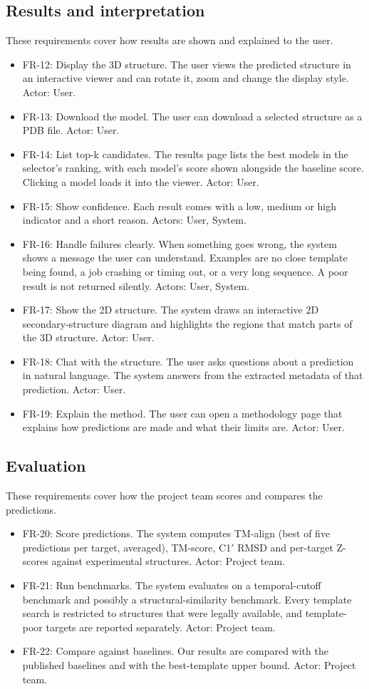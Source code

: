 \documentclass{FastFyp}
\begin{document}
\subsection{Results and interpretation}
These requirements cover how results are shown and explained to the user.
\begin{itemize}
\item FR-12: Display the 3D structure. The user views the predicted structure in an interactive viewer and can rotate it, zoom and change the display style. Actor: User.
\item FR-13: Download the model. The user can download a selected structure as a PDB file. Actor: User.
\item FR-14: List top-k candidates. The results page lists the best models in the selector's ranking, with each model's score shown alongside the baseline score. Clicking a model loads it into the viewer. Actor: User.
\item FR-15: Show confidence. Each result comes with a low, medium or high indicator and a short reason. Actors: User, System.
\item FR-16: Handle failures clearly. When something goes wrong, the system shows a message the user can understand. Examples are no close template being found, a job crashing or timing out, or a very long sequence. A poor result is not returned silently. Actors: User, System.
\item FR-17: Show the 2D structure. The system draws an interactive 2D secondary-structure diagram and highlights the regions that match parts of the 3D structure. Actor: User.
\item FR-18: Chat with the structure. The user asks questions about a prediction in natural language. The system answers from the extracted metadata of that prediction. Actor: User.
\item FR-19: Explain the method. The user can open a methodology page that explains how predictions are made and what their limits are. Actor: User.
\end{itemize}

\subsection{Evaluation}
These requirements cover how the project team scores and compares the predictions.
\begin{itemize}
\item FR-20: Score predictions. The system computes TM-align (best of five predictions per target, averaged), TM-score, C1$'$ RMSD and per-target Z-scores against experimental structures. Actor: Project team.
\item FR-21: Run benchmarks. The system evaluates on a temporal-cutoff benchmark and possibly a structural-similarity benchmark. Every template search is restricted to structures that were legally available, and template-poor targets are reported separately. Actor: Project team.
\item FR-22: Compare against baselines. Our results are compared with the published baselines and with the best-template upper bound. Actor: Project team.
\end{itemize}
\end{document}
